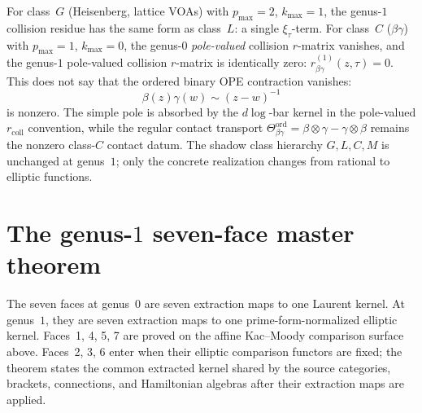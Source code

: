 \begin{remark}
\label{rem:g1sf-class-gc}
For class~$G$ (Heisenberg, lattice VOAs) with
$p_{\max} = 2$, $k_{\max} = 1$, the genus-$1$ collision residue
has the same form as class~$L$: a single $\xi_\tau$-term. For
class~$C$ ($\beta\gamma$) with $p_{\max} = 1$, $k_{\max} = 0$, the
genus-$0$ \emph{pole-valued} collision \(r\)-matrix vanishes, and the
genus-$1$ pole-valued collision \(r\)-matrix is identically zero:
$r_{\beta\gamma}^{(1)}(z, \tau) = 0$. This does not say that the
ordered binary OPE contraction vanishes:
\[
\beta(z)\gamma(w)\sim (z-w)^{-1}
\]
is nonzero. The simple pole is absorbed by the \(d\log\)-bar kernel in
the pole-valued \(r_{\mathrm{coll}}\) convention, while the regular
contact transport
\(\Theta_{\beta\gamma}^{\mathrm{ord}}
=\beta\otimes\gamma-\gamma\otimes\beta\)
remains the nonzero class-\(C\) contact datum. The
shadow class hierarchy
$G, L, C, M$ is unchanged at genus~$1$; only the concrete
realization changes from rational to elliptic functions.
\end{remark}



\section{The genus-$1$ seven-face master theorem}
\label{sec:g1sf-master}

The seven faces at genus~$0$ are seven extraction maps to one Laurent
kernel. At genus~$1$, they are seven extraction maps to one
prime-form-normalized elliptic kernel. Faces~1, 4, 5, 7 are proved on
the affine Kac--Moody comparison surface above. Faces~2, 3, 6 enter
when their elliptic comparison functors are fixed; the theorem states
the common extracted kernel shared by the source categories, brackets,
connections, and Hamiltonian algebras after their extraction maps are
applied.

